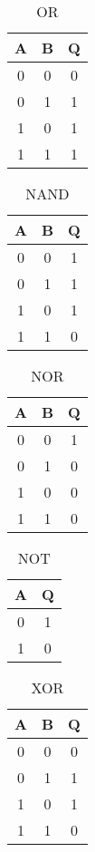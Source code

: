\documentclass[12pt, letterpaper, titlepage]{article}
\begin{document}
\begin{table}[h]
\centering\caption{OR}
\begin{tabular}{c c| c}

A & B & Q\\
\hline
0 & 0 & 0\\
0 & 1 & 1\\
1 & 0 & 1\\
1 & 1 & 1\\

\end{tabular}
\end{table}
\begin{table}[h]
\centering\caption{NAND}
\begin{tabular}{c c| c}

A & B & Q\\
\hline
0 & 0 & 1\\
0 & 1 & 1\\
1 & 0 & 1\\
1 & 1 & 0\\

\end{tabular}
\end{table}
\begin{table}[h]
\centering\caption{NOR}
\begin{tabular}{c c| c}

A & B & Q\\
\hline
0 & 0 & 1\\
0 & 1 & 0\\
1 & 0 & 0\\
1 & 1 & 0\\

\end{tabular}
\end{table}
\begin{table}[h]
\centering\caption{NOT}
\begin{tabular}{c| c}

A & Q\\
\hline
0 & 1\\
1 & 0\\


\end{tabular}
\end{table}
\begin{table}[h]
\centering\caption{XOR}
\begin{tabular}{c c| c}

A & B & Q\\
\hline
0 & 0 & 0\\
0 & 1 & 1\\
1 & 0 & 1\\
1 & 1 & 0\\

\end{tabular}
\end{table}
\end{document}
